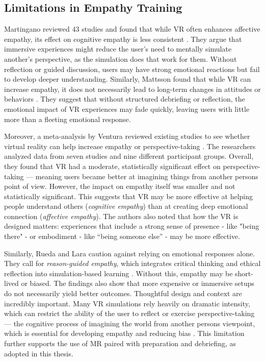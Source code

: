 \subsection{Limitations in Empathy Training}
\label{sec:limitationsempathytraining}

Martingano \cite{Martingano2021} reviewed 43 studies and found that while VR often enhances affective empathy, its effect on cognitive empathy is less consistent \cite{Martingano2021}. They argue that immersive experiences might reduce the user's need to mentally simulate another's perspective, as the simulation does that work for them. Without reflection or guided discussion, users may have strong emotional reactions but fail to develop deeper understanding. Similarly, Mattsson \cite{Mattsson2024} found that while VR can increase empathy, it does not necessarily lead to long-term changes in attitudes or behaviors \cite{Mattsson2024}. They suggest that without structured debriefing or reflection, the emotional impact of VR experiences may fade quickly, leaving users with little more than a fleeting emotional response.

\vspace{1em}

Moreover,  a meta-analysis by Ventura \cite{Ventura2020} reviewed existing studies to see whether virtual reality can help increase empathy or perspective-taking \cite{Ventura2020}. The researchers analyzed data from seven studies and nine different participant groups. Overall, they found that VR had a moderate, statistically significant effect on perspective-taking — meaning users became better at imagining things from another persons point of view. However, the impact on empathy itself was smaller and not statistically significant. This suggests that VR may be more effective at helping people understand others (\textit{cognitive empathy}) than at creating deep emotional connection (\textit{affective empathy}). The authors also noted that how the VR is designed matters: experiences that include a strong sense of presence - like "being there" - or embodiment - like “being someone else” - may be more effective. 

\vspace{1em}

Similarly, Rueda and Lara \cite{Rueda2020} caution against relying on emotional responses alone. They call for \textit{reason-guided empathy}, which integrates critical thinking and ethical reflection into simulation-based learning \cite{Rueda2020}. Without this, empathy may be short-lived or biased. The findings also show that more expensive or immersive setups do not necessarily yield better outcomes. Thoughtful design and context are incredibly important. Many VR simulations rely heavily on dramatic intensity, which can restrict the ability of the user to reflect or exercise perspective-taking — the cognitive process of imagining the world from another persons viewpoint, which is essential for developing empathy and reducing bias \cite{Mattsson2024}. This limitation further supports the use of MR paired with preparation and debriefing, as adopted in this thesis.

